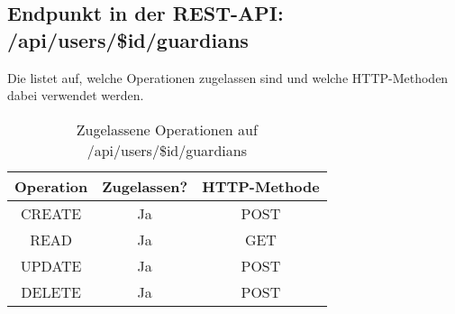 \subsection{Endpunkt in der REST-API: /api/users/\$id/guardians}
Die  listet auf, welche Operationen zugelassen sind und welche HTTP-Methoden dabei verwendet werden. 

\begin{table}[!htbp]
	\begin{tabular}{|c|c|c|}
		\hline
			\textbf{Operation} & \textbf{Zugelassen?} & \textbf{HTTP-Methode} \\ \hline
			CREATE & Ja & POST \\ \hline 
			READ & Ja & GET \\ \hline
			UPDATE & Ja & POST \\ \hline 
			DELETE & Ja & POST \\ \hline
	\end{tabular}

		\caption{Zugelassene Operationen auf /api/users/\$id/guardians}
		\label{tab:rest:api:users:id:guardians:meth}
\end{table}

